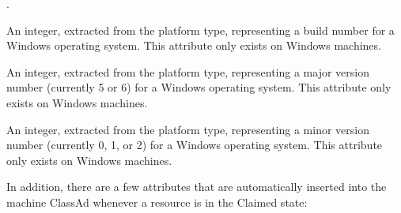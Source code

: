 \begin{description}
.
%
\item[\AdAttr{WindowsBuildNumber}:] An integer, extracted from the
platform type, representing a build number 
for a Windows operating system.
This attribute only exists on Windows machines.
%
\item[\AdAttr{WindowsMajorVersion}:] An integer, extracted from the
platform type, representing a major version number (currently 5 or 6)
for a Windows operating system.
This attribute only exists on Windows machines.
%
\item[\AdAttr{WindowsMinorVersion}:] An integer, extracted from the
platform type, representing a minor version number (currently 0, 1, or 2)
for a Windows operating system.
This attribute only exists on Windows machines.

\end{description}

In addition, there are a few attributes that are automatically
inserted into the machine ClassAd whenever a resource is in the
Claimed state:

